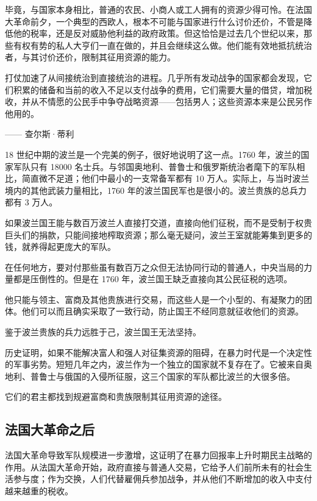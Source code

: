 毕竟，与国家本身相比，普通的农民、小商人或工人拥有的资源少得可怜。在法国大革命前夕，一个典型的西欧人，根本不可能与国家进行什么讨价还价，不管是降低他的税率，还是反对威胁他利益的政府政策。但这恰恰是过去几个世纪以来，那些有权有势的私人大亨们一直在做的，并且会继续这么做。他们能有效地抵抗统治者，与其讨价还价，限制其征用资源的能力。

\begin{tcolorbox}
打仗加速了从间接统治到直接统治的进程。几乎所有发动战争的国家都会发现，它们积累的储备和当前的收入不足以支付战争的费用，它们需要大量的借贷，增加税收，并从不情愿的公民手中争夺战略资源——包括男人；这些资源本来是公民另作他用的。
\begin{flushright}
—— 查尔斯·蒂利 
\end{flushright}
\end{tcolorbox}

18 世纪中期的波兰是一个完美的例子，很好地说明了这一点。1760 年，波兰的国家军队只有 18000 名士兵。与邻国奥地利、普鲁士和俄罗斯统治者麾下的军队相比，简直微不足道；他们中最小的一支常备军都有 10 万人。实际上，与当时波兰境内的其他武装力量相比，1760 年的波兰国民军也是很小的。波兰贵族的总兵力都有 3 万人。

如果波兰国王能与数百万波兰人直接打交道，直接向他们征税，而不是受制于权贵巨头们的捐款，只能间接地榨取资源；那么毫无疑问，波兰王室就能筹集到更多的钱，就养得起更庞大的军队。

在任何地方，要对付那些虽有数百万之众但无法协同行动的普通人，中央当局的力量都是压倒性的。但是在 1760 年，波兰国王缺乏直接向其公民征税的选项。

他只能与领主、富商及其他贵族进行交易，而这些人是一个小型的、有凝聚力的团体。他们可以而且确实采取了一致行动，防止国王不经同意就征收他们的资源。

鉴于波兰贵族的兵力远胜于己，波兰国王无法坚持。

历史证明，如果不能解决富人和强人对征集资源的阻碍，在暴力时代是一个决定性的军事劣势。短短几年之内，波兰作为一个独立的国家就不复存在了。它被来自奥地利、普鲁士与俄国的入侵所征服，这三个国家的军队都比波兰的大很多倍。

它们的君主都找到规避富商和贵族限制其征用资源的途径。

\subsection{法国大革命之后}
法国大革命导致军队规模进一步激增，这证明了在暴力回报率上升时期民主战略的作用。从法国大革命开始，政府直接与普通人交易，它给予人们前所未有的社会生活参与度；作为交换，人们代替雇佣兵参加战争，并从他们不断增加的收入中支付越来越重的税收。


